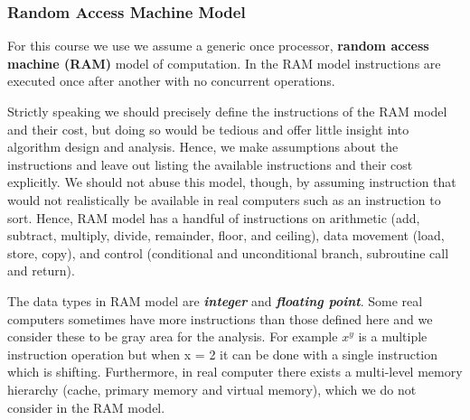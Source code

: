 \documentclass[12pt,a4paper]{book}
\begin{document}
\subsubsection{Random Access Machine Model}
For this course we use we assume a generic once processor, \textbf{random access machine (RAM)} model of computation. In the RAM model instructions are executed once after another with no concurrent operations.
\par Strictly speaking we should precisely define the instructions of the RAM model and their cost, but doing so would be tedious and offer little insight into algorithm design and analysis. Hence, we make assumptions about the instructions and leave out listing the available instructions and their cost explicitly. We should not abuse this model, though, by assuming instruction that would not realistically be available in real computers such as an instruction to sort. Hence, RAM model has a handful of instructions on arithmetic (add, subtract, multiply, divide, remainder, floor, and ceiling), data movement (load, store, copy), and control (conditional and unconditional branch, subroutine call and return).
\par The data types in RAM model are \textbf{\textit{integer}} and \textbf{\textit{floating point}}. Some real computers sometimes have more instructions than those defined here and we consider these to be gray area for the analysis. For example $x^y$ is a multiple instruction operation but when x = 2 it can be done with a single instruction which is shifting. Furthermore, in real computer there exists a multi-level memory hierarchy (cache, primary memory and virtual memory), which we do not consider in the RAM model.
\end{document}
